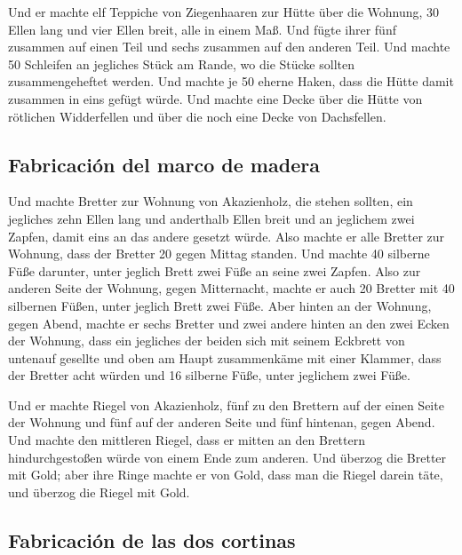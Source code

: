  Und er machte elf Teppiche von Ziegenhaaren zur Hütte
über die Wohnung,  30 Ellen lang und vier Ellen breit,
alle in einem Maß.  Und fügte ihrer fünf zusammen auf
einen Teil und sechs zusammen auf den anderen Teil.  Und
machte 50 Schleifen an jegliches Stück am Rande, wo die Stücke sollten
zusammengeheftet werden.  Und machte je 50 eherne Haken,
dass die Hütte damit zusammen in eins gefügt würde.  Und
machte eine Decke über die Hütte von rötlichen Widderfellen und über die
noch eine Decke von Dachsfellen.

\hypertarget{fabricaciuxf3n-del-marco-de-madera}{%
\subsection{Fabricación del marco de
madera}\label{fabricaciuxf3n-del-marco-de-madera}}

 Und machte Bretter zur Wohnung von Akazienholz, die
stehen sollten,  ein jegliches zehn Ellen lang und
anderthalb Ellen breit  und an jeglichem zwei Zapfen,
damit eins an das andere gesetzt würde. Also machte er alle Bretter zur
Wohnung,  dass der Bretter 20 gegen Mittag standen.
 Und machte 40 silberne Füße darunter, unter jeglich
Brett zwei Füße an seine zwei Zapfen.  Also zur anderen
Seite der Wohnung, gegen Mitternacht, machte er auch 20 Bretter
 mit 40 silbernen Füßen, unter jeglich Brett zwei Füße.
 Aber hinten an der Wohnung, gegen Abend, machte er sechs
Bretter  und zwei andere hinten an den zwei Ecken der
Wohnung,  dass ein jegliches der beiden sich mit seinem
Eckbrett von untenauf gesellte und oben am Haupt zusammenkäme mit einer
Klammer,  dass der Bretter acht würden und 16 silberne
Füße, unter jeglichem zwei Füße.

 Und er machte Riegel von Akazienholz, fünf zu den
Brettern auf der einen Seite der Wohnung  und fünf auf
der anderen Seite und fünf hintenan, gegen Abend.  Und
machte den mittleren Riegel, dass er mitten an den Brettern
hindurchgestoßen würde von einem Ende zum anderen.  Und
überzog die Bretter mit Gold; aber ihre Ringe machte er von Gold, dass
man die Riegel darein täte, und überzog die Riegel mit Gold.

\hypertarget{fabricaciuxf3n-de-las-dos-cortinas}{%
\subsection{Fabricación de las dos
cortinas}\label{fabricaciuxf3n-de-las-dos-cortinas}}

